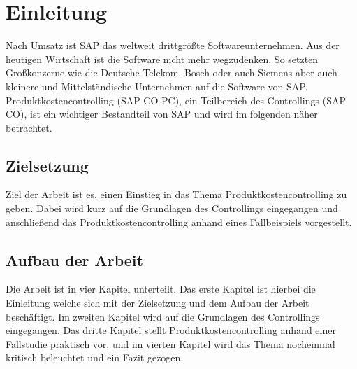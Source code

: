 \section{Einleitung}
Nach Umsatz ist SAP das weltweit drittgrößte Softwareunternehmen. \cite{GroessteUnternehmen} Aus der heutigen Wirtschaft ist die Software nicht mehr wegzudenken.
So setzten Großkonzerne wie die Deutsche Telekom, Bosch oder auch Siemens aber auch kleinere und Mittelständische Unternehmen auf die Software von SAP. \cite{SAPCustomers}
Produktkostencontrolling (SAP CO-PC), ein Teilbereich des Controllings (SAP CO), ist ein wichtiger Bestandteil von SAP und wird im folgenden näher betrachtet.

\subsection{Zielsetzung}
Ziel der Arbeit ist es, einen Einstieg in das Thema Produktkostencontrolling zu geben. Dabei wird kurz auf die Grundlagen des Controllings eingegangen und anschließend das Produktkostencontrolling anhand eines
Fallbeispiels vorgestellt. 

\subsection{Aufbau der Arbeit}
Die Arbeit ist in vier Kapitel unterteilt. Das erste Kapitel ist hierbei die Einleitung welche sich mit der Zielsetzung und dem Aufbau der Arbeit beschäftigt. Im zweiten Kapitel wird auf die Grundlagen des Controllings eingegangen. 
Das dritte Kapitel stellt Produktkostencontrolling anhand einer Fallstudie praktisch vor, und im vierten Kapitel wird das Thema nocheinmal kritisch beleuchtet und ein Fazit gezogen.
